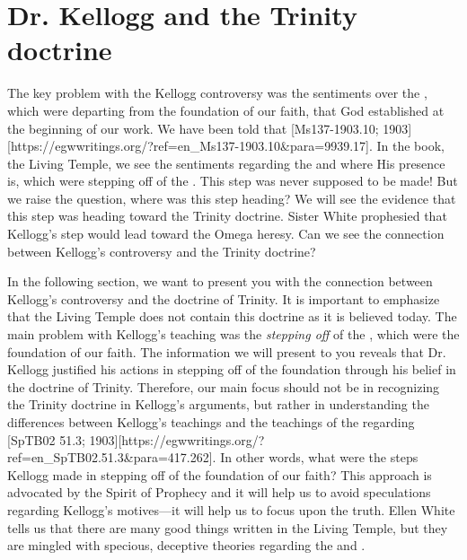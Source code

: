 \chapter{Dr. Kellogg and the Trinity doctrine}

The key problem with the Kellogg controversy was the sentiments over the , which were departing from the foundation of our faith, that God established at the beginning of our work. We have been told that [Ms137-1903.10; 1903][https://egwwritings.org/?ref=en\_Ms137-1903.10&para=9939.17]. In the book, the Living Temple, we see the sentiments regarding the  and where His presence is, which were stepping off of the . This step was never supposed to be made! But we raise the question, where was this step heading? We will see the evidence that this step was heading toward the Trinity doctrine. Sister White prophesied that Kellogg’s step would lead toward the Omega heresy. Can we see the connection between Kellogg’s controversy and the Trinity doctrine?

In the following section, we want to present you with the connection between Kellogg’s controversy and the doctrine of Trinity. It is important to emphasize that the Living Temple does not contain this doctrine as it is believed today. The main problem with Kellogg’s teaching was the \textit{stepping off} of the , which were the foundation of our faith. The information we will present to you reveals that Dr. Kellogg justified his actions in stepping off of the foundation through his belief in the doctrine of Trinity. Therefore, our main focus should not be in recognizing the Trinity doctrine in Kellogg's arguments, but rather in understanding the differences between Kellogg’s teachings and the teachings of the  regarding [SpTB02 51.3; 1903][https://egwwritings.org/?ref=en\_SpTB02.51.3&para=417.262]. In other words, what were the steps Kellogg made in stepping off of the foundation of our faith? This approach is advocated by the Spirit of Prophecy and it will help us to avoid speculations regarding Kellogg’s motives—it will help us to focus upon the truth. Ellen White tells us that there are many good things written in the Living Temple, but they are mingled with specious, deceptive theories regarding the  and .

